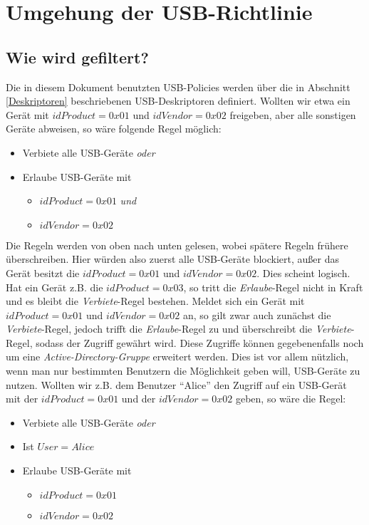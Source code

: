 \chapter{Umgehung der USB-Richtlinie}\label{Angriff}

\section{Wie wird gefiltert?}
Die in diesem Dokument benutzten USB-Policies werden über die in Abschnitt \ref{Deskriptoren} beschriebenen USB-Deskriptoren definiert. Wollten wir etwa ein Gerät mit $idProduct=0x01$ und $idVendor=0x02$ freigeben, aber alle sonstigen Geräte abweisen, so wäre folgende Regel möglich:
			\begin{itemize}
				\item Verbiete alle USB-Geräte \textit{oder}
				\item Erlaube USB-Geräte mit
				\begin{itemize}
					\item $idProduct=0x01$ \textit{und}
					\item $idVendor=0x02$
				\end{itemize}
			\end{itemize}
Die Regeln werden von oben nach unten gelesen, wobei spätere Regeln frühere überschreiben. Hier würden also zuerst alle USB-Geräte blockiert, außer das Gerät besitzt die $idProduct=0x01$ und $idVendor=0x02$. Dies scheint logisch. Hat ein Gerät z.B. die $idProduct=0x03$, so tritt die \textit{Erlaube}-Regel nicht in Kraft und es bleibt die \textit{Verbiete}-Regel bestehen. Meldet sich ein Gerät mit $idProduct=0x01$ und $idVendor=0x02$ an, so gilt zwar auch zunächst die \textit{Verbiete}-Regel, jedoch trifft die \textit{Erlaube}-Regel zu und überschreibt die \textit{Verbiete}-Regel, sodass der Zugriff gewährt wird.
Diese Zugriffe können gegebenenfalls noch um eine \textit{Active-Directory-Gruppe} erweitert werden. Dies ist vor allem nützlich, wenn man nur bestimmten Benutzern die Möglichkeit geben will, USB-Geräte zu nutzen. Wollten wir z.B. dem Benutzer "`Alice"' den Zugriff auf ein USB-Gerät mit der $idProduct=0x01$ und der $idVendor=0x02$ geben, so wäre die Regel:
			\begin{itemize}
				\item Verbiete alle USB-Geräte \textit{oder}
				\item Ist $User=Alice$
				\item Erlaube USB-Geräte mit
				\begin{itemize}
					\item $idProduct=0x01$
					\item $idVendor=0x02$
				\end{itemize} 
			\end{itemize}

